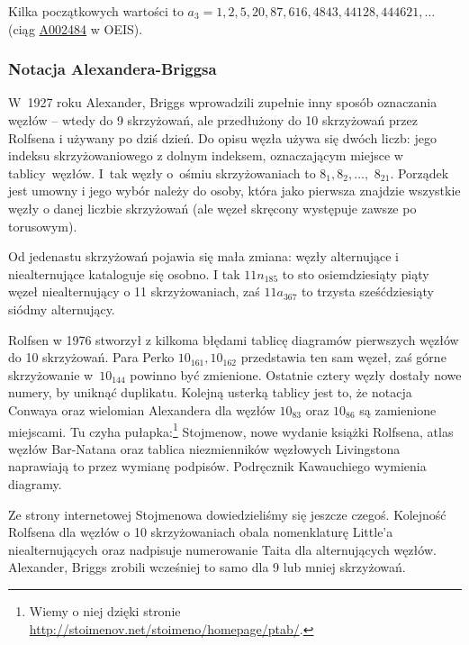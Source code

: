 Kilka początkowych wartości to $a_3 = 1, 2, 5, 20, 87, 616, 4843, 44128, 444621, \ldots$ (ciąg \href{https://oeis.org/A002484}{A002484} w OEIS).

%

\subsubsection{Notacja Alexandera-Briggsa}
\label{alexander_briggs_notation}%
%
W~1927 roku Alexander, Briggs wprowadzili zupełnie inny sposób oznaczania węzłów -- wtedy do 9 skrzyżowań, ale przedłużony do 10 skrzyżowań przez Rolfsena i używany po dziś dzień.
Do opisu węzła używa się dwóch liczb: jego indeksu skrzyżowaniowego z dolnym indeksem, oznaczającym miejsce w tablicy~węzłów.
I~tak węzły o~ośmiu skrzyżowaniach to $8_1, 8_2, \ldots,$ $8_{21}$.
Porządek jest umowny i jego wybór należy do osoby, która jako pierwsza znajdzie wszystkie węzły o danej liczbie skrzyżowań (ale węzeł skręcony występuje zawsze po torusowym).
%
%

Od jedenastu skrzyżowań pojawia się mała zmiana: węzły alternujące i niealternujące kataloguje się osobno.
I tak $11n_{185}$ to sto osiemdziesiąty piąty węzeł niealternujący o 11 skrzyżowaniach, zaś $11a_{367}$ to trzysta sześćdziesiąty siódmy alternujący.

Rolfsen w 1976 stworzył z kilkoma błędami tablicę diagramów pierwszych węzłów do 10 skrzyżowań.
%
\label{rolfsens_mistake}%
Para Perko $10_{161}, 10_{162}$ przedstawia ten sam węzeł, zaś górne skrzyżowanie w~$10_{144}$ powinno być zmienione.
%
Ostatnie cztery węzły dostały nowe numery, by uniknąć duplikatu.
Kolejną usterką tablicy jest to, że notacja Conwaya oraz wielomian Alexandera dla węzłów $10_{83}$ oraz $10_{86}$ są zamienione miejscami.
Tu czyha pułapka:\footnote{Wiemy o niej dzięki stronie \url{http://stoimenov.net/stoimeno/homepage/ptab/}.} Stojmenow, nowe wydanie książki Rolfsena, atlas węzłów Bar-Natana oraz tablica niezmienników węzłowych Livingstona naprawiają to przez wymianę podpisów.
Podręcznik Kawauchiego wymienia diagramy.

Ze strony internetowej Stojmenowa dowiedzieliśmy się jeszcze czegoś.
Kolejność Rolfsena dla węzłów o 10 skrzyżowaniach obala nomenklaturę Little'a niealternujących oraz nadpisuje numerowanie Taita dla alternujących węzłów.
%
Alexander, Briggs zrobili wcześniej to samo dla 9 lub mniej skrzyżowań.

